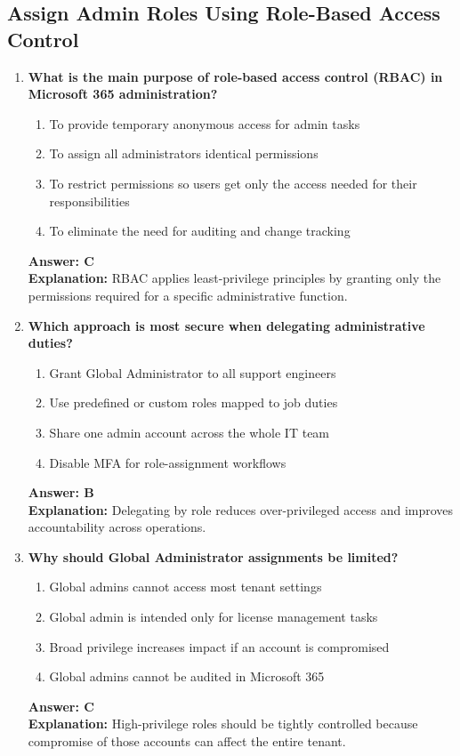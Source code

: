 \documentclass[10pt]{article}
\begin{document}
\subsection{Assign Admin Roles Using Role-Based Access Control}
\begin{enumerate}[leftmargin=*]

\item \textbf{What is the main purpose of role-based access control (RBAC) in Microsoft 365 administration?}
\begin{enumerate}[label=\Alph*.]
  \item To provide temporary anonymous access for admin tasks
  \item To assign all administrators identical permissions
  \item To restrict permissions so users get only the access needed for their responsibilities
  \item To eliminate the need for auditing and change tracking
\end{enumerate}
\textbf{Answer: C}\\
\textbf{Explanation:} RBAC applies least-privilege principles by granting only the permissions required for a specific administrative function.

\item \textbf{Which approach is most secure when delegating administrative duties?}
\begin{enumerate}[label=\Alph*.]
  \item Grant Global Administrator to all support engineers
  \item Use predefined or custom roles mapped to job duties
  \item Share one admin account across the whole IT team
  \item Disable MFA for role-assignment workflows
\end{enumerate}
\textbf{Answer: B}\\
\textbf{Explanation:} Delegating by role reduces over-privileged access and improves accountability across operations.

\item \textbf{Why should Global Administrator assignments be limited?}
\begin{enumerate}[label=\Alph*.]
  \item Global admins cannot access most tenant settings
  \item Global admin is intended only for license management tasks
  \item Broad privilege increases impact if an account is compromised
  \item Global admins cannot be audited in Microsoft 365
\end{enumerate}
\textbf{Answer: C}\\
\textbf{Explanation:} High-privilege roles should be tightly controlled because compromise of those accounts can affect the entire tenant.


\end{enumerate}
\end{document}
